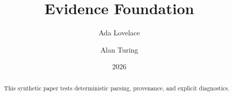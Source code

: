 \documentclass{article}
\title{Evidence \textbf{Foundation}}
\author{Ada Lovelace \and Alan Turing}
\date{2026}
\begin{document}
\maketitle

\begin{abstract}
This synthetic paper tests deterministic parsing, provenance, and explicit diagnostics.
\end{abstract}




\end{document}
